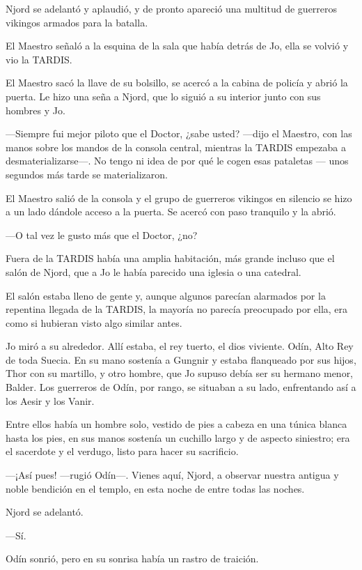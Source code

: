 Njord se adelantó y aplaudió, y de pronto apareció una multitud de
guerreros vikingos armados para la batalla.

El Maestro señaló a la esquina de la sala que había detrás de Jo, ella
se volvió y vio la TARDIS.

El Maestro sacó la llave de su bolsillo, se acercó a la cabina de
policía y abrió la puerta. Le hizo una seña a Njord, que lo siguió a su
interior junto con sus hombres y Jo.

---Siempre fui mejor piloto que el Doctor, ¿sabe usted? ---dijo el
Maestro, con las manos sobre los mandos de la consola central, mientras
la TARDIS empezaba a desmaterializarse---. No tengo ni idea de por qué
le cogen esas pataletas --- unos segundos más tarde se materializaron.

El Maestro salió de la consola y el grupo de guerreros vikingos en
silencio se hizo a un lado dándole acceso a la puerta. Se acercó con
paso tranquilo y la abrió.

---O tal vez le gusto más que el Doctor, ¿no?

Fuera de la TARDIS había una amplia habitación, más grande incluso que
el salón de Njord, que a Jo le había parecido una iglesia o una
catedral.

El salón estaba lleno de gente y, aunque algunos parecían alarmados por
la repentina llegada de la TARDIS, la mayoría no parecía preocupado por
ella, era como si hubieran visto algo similar antes.

Jo miró a su alrededor. Allí estaba, el rey tuerto, el dios viviente.
Odín, Alto Rey de toda Suecia. En su mano sostenía a Gungnir y estaba
flanqueado por sus hijos, Thor con su martillo, y otro hombre, que Jo
supuso debía ser su hermano menor, Balder. Los guerreros de Odín, por
rango, se situaban a su lado, enfrentando así a los Aesir y los Vanir.

Entre ellos había un hombre solo, vestido de pies a cabeza en una túnica
blanca hasta los pies, en sus manos sostenía un cuchillo largo y de
aspecto siniestro; era el sacerdote y el verdugo, listo para hacer su
sacrificio.

---¡Así pues! ---rugió Odín---. Vienes aquí, Njord, a observar nuestra
antigua y noble bendición en el templo, en esta noche de entre todas las
noches.

Njord se adelantó.

---Sí.

Odín sonrió, pero en su sonrisa había un rastro de traición.

